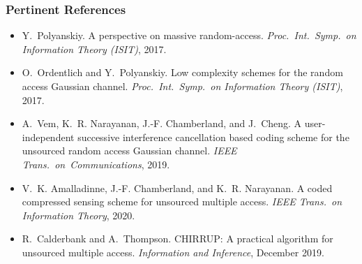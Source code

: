 \begin{frame}
\frametitle{Pertinent References}
\begin{footnotesize}
\begin{itemize}

\item
Y.~Polyanskiy.
A perspective on massive random-access.
\emph{Proc.~Int.\ Symp.\ on Information Theory (ISIT)}, 2017.

\item
O.~Ordentlich and Y.~Polyanskiy.
Low complexity schemes for the random access Gaussian channel.
\emph{Proc.~Int.\ Symp.\ on Information Theory (ISIT)}, 2017.

\item
A.~Vem, K.~R. Narayanan, J.-F. Chamberland, and J.~Cheng.
A user-independent successive interference cancellation based coding scheme for the unsourced random access Gaussian channel.
\emph{IEEE Trans.\ on~Communications}, 2019.

\item
V.~K. Amalladinne, J.-F. Chamberland, and K.~R. Narayanan.
A coded compressed sensing scheme for unsourced multiple access.
\emph{IEEE Trans.\ on Information Theory}, 2020.

\item
R.~Calderbank and A.~Thompson.
CHIRRUP: A practical algorithm for unsourced multiple access.
\emph{Information and Inference}, December 2019.

\end{itemize}
\end{footnotesize}
\end{frame}

